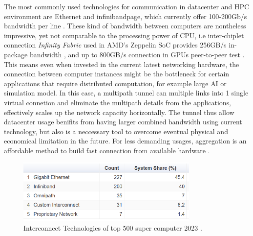 The most commonly used technologies for communication in datacenter and \ac{HPC} environment are Ethernet and \ac{infinibandpage}, which currently offer 100-200Gb/s bandwidth per line \cite{ethernet_roadmap}\cite{infiniband_roadmap}.
These kind of bandwidth between computers are nontheless impressive, yet not comparable to the processing power of CPU, i.e inter-chiplet connection \textit{Infinity Fabric} used in AMD's Zeppelin SoC provides 256GB/s in-package bandwidth \cite{burd_zeppelin_2019}, and up to 800GB/s connection in GPUs peer-to-peer test \cite{amd_infinity_architecture}.
This means even when invested in the current latest networking hardware, the connection between computer instances might be the bottleneck for certain applications that require distributed computation, for example large \ac{AI} or simulation model.
In this case, a multipath tunnel can multiple links into 1 single virtual connetion and eliminate the multipath details from the applications, effectively scales up the network capacity horizontally.
The tunnel thus allow datacenter usage benifits from having larger combined bandwidth using current technology, but also is a neccessary tool to overcome eventual physical and economical limitation in the future.
For less demanding usages, aggregation is an affordable method to build fast connection from available hardware .



\begin{figure}[H]
	\centering
	\includegraphics[width=0.8\textwidth]{resources/images/Interconnect_Technologies_500_supercomp.PNG}
	\caption{Interconnect Technologies of top 500 super computer 2023 \cite{Interconnect_Technologies_500_supercomp}.}
    \label{fig:introduction:Interconnect_Technologies_500_supercomp}
\end{figure}



